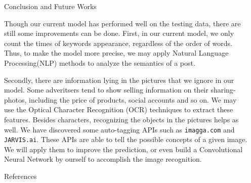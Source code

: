 \documentclass[final,hyperref={pdfpagelabels=false}]{beamer}
\begin{document}
\begin{frame}[t]
\begin{columns}[t]
\begin{column}{.465\textwidth}

\begin{block}{Conclusion and Future Works}

Though our current model has performed well on the testing data, there are still some improvements can be done. First, in our current model, we only count the times of keywords appearance, regardless of the order of words. Thus, to make the model more precise, we may apply Natural Language Processing(NLP) methods to analyze the semantics of a post. 

\quad Secondly, there are information lying in the pictures that we ignore in our model. Some adveritsers tend to show selling information on their sharing-photos, including the price of products, social accounts and so on. We may use the Optical Character Recognition (OCR) techniques to extract these features. Besides characters, recognizing the objects in the pictures helps as well. We have discovered some auto-tagging APIs such as \texttt{imagga.com} and \texttt{JARVIS.ai}. These APIs are able to tell the possible concepts of a given image. We will apply them to improve the prediction, or even build a Convolutional Neural Network by ourself to accomplish the image recognition.


\end{block}


\begin{block}{References}




\end{block}



\end{column} %

\begin{column}{.015\textwidth}\end{column} %

\end{columns} %

\end{frame} %
\end{document}
